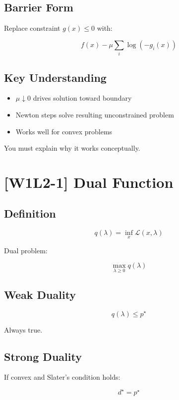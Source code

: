 \documentclass[11pt]{article}
\begin{document}
\subsection*{Barrier Form}

Replace constraint $g(x)\le0$ with:

\[
f(x) - \mu \sum_i \log(-g_i(x))
\]

\subsection*{Key Understanding}

\begin{itemize}
\item $\mu \downarrow 0$ drives solution toward boundary
\item Newton steps solve resulting unconstrained problem
\item Works well for convex problems
\end{itemize}

You must explain why it works conceptually.

\newpage

\section*{[W1L2-1] Dual Function}

\subsection*{Definition}

\[
q(\lambda) = \inf_x \mathcal{L}(x,\lambda)
\]

Dual problem:

\[
\max_{\lambda \ge 0} q(\lambda)
\]

\subsection*{Weak Duality}

\[
q(\lambda) \le p^\star
\]

Always true.

\subsection*{Strong Duality}

If convex and Slater’s condition holds:

\[
d^\star = p^\star
\]
\end{document}
